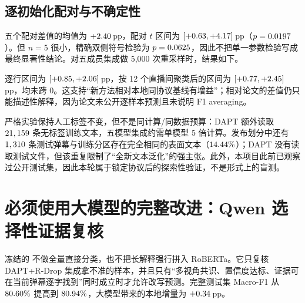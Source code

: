\documentclass[UTF8,zihao=-4,a4paper]{ctexart}
\newcommand{\pp}{\,pp}
\begin{document}
\subsection{逐初始化配对与不确定性}

\begin{table}[H]
\centering
\small
\caption{同一标签集、同一初始化种子的逐成员配对结果。五个差值全部为正。}
\label{tab:same-budget-members}

\end{table}

五个配对差值的均值为 $+2.40$\pp，配对 $t$ 区间为
$[+0.63,+4.17]$\pp（$p=0.0197$）。但 $n=5$ 很小，精确双侧符号检验为
$p=0.0625$，因此不把单一参数检验写成最终显著性结论。对五成员集成做 5,000 次重采样时，结果如下。

\begin{table}[H]
\centering
\small
\caption{DAPT+R-Drop 同标签集成相对固定 split 基线集成的 paired bootstrap。}
\label{tab:same-budget-bootstrap}

\end{table}

逐行区间为 $[+0.85,+2.06]$\pp，按 12 个直播间聚类后的区间为
$[+0.77,+2.45]$\pp，均未跨 0。这支持“新方法相对本地同协议基线有增益”；相对论文的差值仍只能描述性解释，因为论文未公开逐样本预测且未说明 F1 averaging。

\begin{warningbox}[成立范围]
严格实验保持人工标签不变，但不是同计算/同数据预算：DAPT 额外读取 $21,159$ 条无标签训练文本，五模型集成约需单模型 5 倍计算。发布划分中还有 $1,310$ 条测试弹幕与训练分区存在完全相同的表面文本（$14.44\%$）；DAPT 没有读取测试文件，但该重复限制了“全新文本泛化”的强主张。此外，本项目此前已观察过公开测试集，因此本轮属于锁定协议后的探索性验证，不是形式上的盲测。
\end{warningbox}

\clearpage
\section{必须使用大模型的完整改进：Qwen 选择性证据复核}

\begin{keybox}[本轮真正加入大模型后的主结果]
冻结的 \QwenGateModel 不做全量直接分类，也不把长解释强行拼入 RoBERTa。它只复核 DAPT+R-Drop 集成拿不准的样本，并且只有“多视角共识、置信度达标、证据可在当前弹幕逐字找到”同时成立时才允许改写预测。完整测试集 Macro-F1 从 $80.60\%$ 提高到 $80.94\%$，大模型带来的本地增量为 $+0.34$\pp。
\end{keybox}
\end{document}
